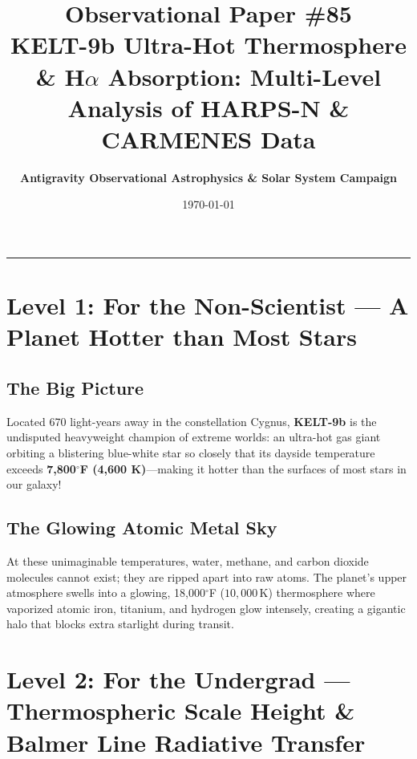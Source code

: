 \documentclass[11pt,a4paper]{article}
\title{\Huge \textbf{Observational Paper \#85}\\ \Large KELT-9b Ultra-Hot Thermosphere \& H$\alpha$ Absorption: Multi-Level Analysis of HARPS-N \& CARMENES Data}
\author{\textbf{Antigravity Observational Astrophysics \& Solar System Campaign}}
\date{\today}
\begin{document}
\maketitle

\vspace{-1em}
\begin{center}
\rule{\textwidth}{1.5pt}
\end{center}

\section*{Level 1: For the Non-Scientist — A Planet Hotter than Most Stars}

\subsection*{The Big Picture}
Located 670 light-years away in the constellation Cygnus, \textbf{KELT-9b} is the undisputed heavyweight champion of extreme worlds: an ultra-hot gas giant orbiting a blistering blue-white star so closely that its dayside temperature exceeds \textbf{7,800$^\circ$F (4,600 K)}—making it hotter than the surfaces of most stars in our galaxy!

\subsection*{The Glowing Atomic Metal Sky}
At these unimaginable temperatures, water, methane, and carbon dioxide molecules cannot exist; they are ripped apart into raw atoms. The planet's upper atmosphere swells into a glowing, 18,000$^\circ$F ($10{,}000\,\text{K}$) thermosphere where vaporized atomic iron, titanium, and hydrogen glow intensely, creating a gigantic halo that blocks extra starlight during transit.

\newpage

\section*{Level 2: For the Undergrad — Thermospheric Scale Height \& Balmer Line Radiative Transfer}
\end{document}
